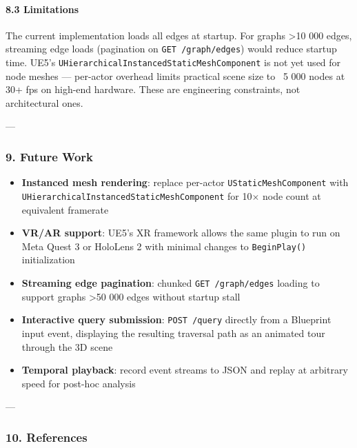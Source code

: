 \paragraph{8.3 Limitations}

The current imple\-mentation loads all edges at startup. For graphs \textgreater  10 000 edges, streaming edge loads (pagination on \texttt{GET /graph/edges}) would reduce startup time. UE5's \texttt{UHierarchicalInstancedStaticMeshComponent} is not yet used for node meshes — per-actor overhead limits practical scene size to ~5 000 nodes at 30+ fps on high-end hardware. These are engineering constraints, not archi\-tectural ones.

---

\subsubsection{9. Future Work}

\begin{itemize}
\item \textbf{Instanced mesh rendering}: replace per-actor \texttt{UStaticMeshComponent} with \texttt{UHierarchicalInstancedStaticMeshComponent} for 10$\times$ node count at equivalent framerate
\item \textbf{VR/AR support}: UE5's XR framework allows the same plugin to run on Meta Quest 3 or HoloLens 2 with minimal changes to \texttt{BeginPlay()} initi\-alization
\item \textbf{Streaming edge pagination}: chunked \texttt{GET /graph/edges} loading to support graphs \textgreater  50 000 edges without startup stall
\item \textbf{Interactive query submission}: \texttt{POST /query} directly from a Blueprint input event, displaying the resulting traversal path as an animated tour through the 3D scene
\item \textbf{Temporal playback}: record event streams to JSON and replay at arbitrary speed for post-hoc analysis

\end{itemize}
---

\subsubsection{10. References}

